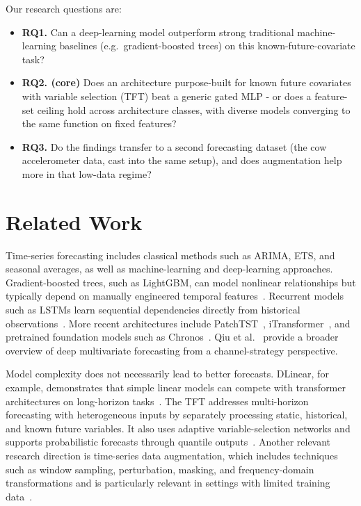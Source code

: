 \documentclass[11pt]{article}
\begin{document}
\noindent Our research questions are:

\begin{itemize}
    \item \textbf{RQ1.}
    Can a deep-learning model outperform strong traditional machine-learning
    baselines (e.g.\ gradient-boosted trees) on this
    known-future-covariate task?

    \item \textbf{RQ2. (core)}
    Does an architecture purpose-built for known future covariates with
    variable selection (TFT) beat a generic gated MLP - or does a feature-set
    ceiling hold across architecture classes, with diverse models converging
    to the same function on fixed features?

    \item \textbf{RQ3.}
    Do the findings transfer to a second forecasting dataset (the cow
    accelerometer data, cast into the same setup), and does augmentation help
    more in that low-data regime?
\end{itemize}



\section{Related Work}
Time-series forecasting includes classical methods such as ARIMA, ETS, and
seasonal averages, as well as machine-learning and deep-learning approaches.
Gradient-boosted trees, such as LightGBM, can model nonlinear relationships but
typically depend on manually engineered temporal features~\cite{lightgbm}.
Recurrent models such as LSTMs learn sequential dependencies directly from
historical observations~\cite{lstm}. More recent architectures include
PatchTST~\cite{patchtst}, iTransformer~\cite{itransformer}, and pretrained
foundation models such as Chronos~\cite{chronos}. Qiu et
al.~\cite{channelsurvey} provide a broader overview of deep multivariate
forecasting from a channel-strategy perspective.
\newline

\noindent Model complexity does not necessarily lead to better forecasts. DLinear, for
example, demonstrates that simple linear models can compete with transformer
architectures on long-horizon tasks~\cite{dlinear}. The TFT addresses multi-horizon forecasting with heterogeneous inputs by
separately processing static, historical, and known future variables. It also
uses adaptive variable-selection networks and supports probabilistic forecasts
through quantile outputs~\cite{tft}. Another relevant research direction is
time-series data augmentation, which includes techniques such as window
sampling, perturbation, masking, and frequency-domain transformations and is
particularly relevant in settings with limited training data~\cite{augsurvey}.
\end{document}
